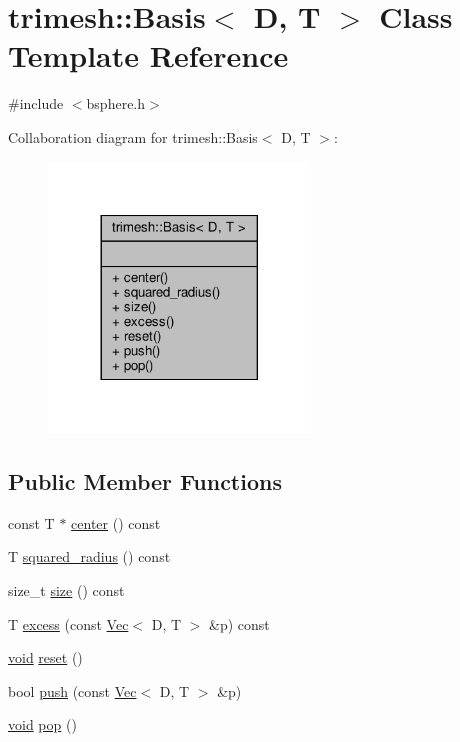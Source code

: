 \hypertarget{classtrimesh_1_1Basis}{}\section{trimesh\+:\+:Basis$<$ D, T $>$ Class Template Reference}
\label{classtrimesh_1_1Basis}


{\ttfamily \#include $<$bsphere.\+h$>$}



Collaboration diagram for trimesh\+:\+:Basis$<$ D, T $>$\+:\nopagebreak
\begin{figure}[H]
\begin{center}
\leavevmode
\includegraphics[width=197pt]{d9/d58/classtrimesh_1_1Basis__coll__graph}
\end{center}
\end{figure}
\subsection*{Public Member Functions}
\begin{DoxyCompactItemize}
\item 
const T $\ast$ \hyperlink{classtrimesh_1_1Basis_a2af24b4e2a734c790675c0e8e3a596f1}{center} () const
\item 
T \hyperlink{classtrimesh_1_1Basis_a6af18ad45b2e277767edc07ef7edeaba}{squared\+\_\+radius} () const
\item 
size\+\_\+t \hyperlink{classtrimesh_1_1Basis_ab6a1d0fdbcbbaa787d94100ebe1ab3b1}{size} () const
\item 
T \hyperlink{classtrimesh_1_1Basis_a43fa98abe1d7a2d8636ecb662af75d56}{excess} (const \hyperlink{classtrimesh_1_1Vec}{Vec}$<$ D, T $>$ \&p) const
\item 
\hyperlink{namespacetrimesh_a784ddfd979e1c579bda795a8edfc3f43}{void} \hyperlink{classtrimesh_1_1Basis_ab90120bbba4505a92d39258454a63dfa}{reset} ()
\item 
bool \hyperlink{classtrimesh_1_1Basis_a9dfc260252428e3b2bf890a92412b7fd}{push} (const \hyperlink{classtrimesh_1_1Vec}{Vec}$<$ D, T $>$ \&p)
\item 
\hyperlink{namespacetrimesh_a784ddfd979e1c579bda795a8edfc3f43}{void} \hyperlink{classtrimesh_1_1Basis_a617b8507dc31a31a3dc10a5a558203ad}{pop} ()
\end{DoxyCompactItemize}


